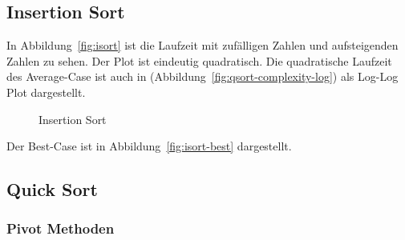 
\subsection{Insertion Sort}\label{subsec:insertion-sort-laufzeit}

In Abbildung~\ref{fig:isort} ist die Laufzeit mit zufälligen Zahlen und
aufsteigenden Zahlen zu sehen.
Der Plot ist eindeutig quadratisch.%
Die quadratische Laufzeit des Average-Case ist auch in
(Abbildung~\ref{fig:qsort-complexity-log}) als Log-Log Plot dargestellt.
\begin{figure}[hbt]
    \centering
    \caption{Insertion Sort}
    \hfill
\end{figure}

Der Best-Case ist in Abbildung~\ref{fig:isort-best} dargestellt.

\subsection{Quick Sort}\label{subsec:quick-sort-laufzeit}

\subsubsection{Pivot Methoden}


